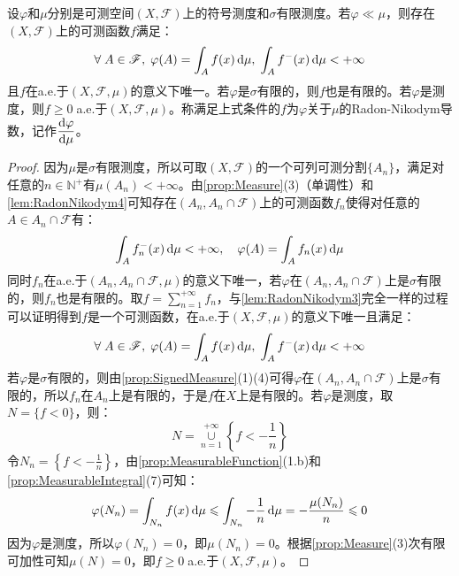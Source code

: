 \begin{theorem}\label{theo:RadonNikodym}
	设$\varphi$和$\mu$分别是可测空间$(X,\mathscr{F})$上的符号测度和$\sigma$有限测度。若$\varphi\ll\mu$，则存在$(X,\mathscr{F})$上的可测函数$f$满足：
	\begin{equation*}
		\forall\;A\in\mathscr{F},\;\varphi(A)=\int_{A}f(x)\mathop{}\!\mathrm{d}\mu,\;\int_{A }f^-(x)\mathop{}\!\mathrm{d}\mu<+\infty
	\end{equation*}
	且$f$在a.e.于$(X,\mathscr{F},\mu)$的意义下唯一。若$\varphi$是$\sigma$有限的，则$f$也是有限的。若$\varphi$是测度，则$f\geqslant0\;$a.e.于$(X,\mathscr{F},\mu)$。称满足上式条件的$f$为$\varphi$关于$\mu$的Radon-Nikodym导数，记作$\dfrac{\mathop{}\!\mathrm{d}\varphi}{\mathop{}\!\mathrm{d}\mu}$。
\end{theorem}
\begin{proof}
	因为$\mu$是$\sigma$有限测度，所以可取$(X,\mathscr{F})$的一个可列可测分割$\{A_n\}$，满足对任意的$n\in\mathbb{N}^+$有$\mu(A_n)<+\infty$。由\cref{prop:Measure}(3)（单调性）和\cref{lem:RadonNikodym4}可知存在$(A_n,A_n\cap\mathscr{F})$上的可测函数$f_n$使得对任意的$A\in A_n\cap\mathscr{F}$有：
	\begin{equation*}
		\int_{A}f_n^-(x)\mathop{}\!\mathrm{d}\mu<+\infty,\quad\varphi(A)=\int_{A}f_n(x)\mathop{}\!\mathrm{d}\mu
	\end{equation*}
	同时$f_n$在a.e.于$(A_n,A_n\cap\mathscr{F},\mu)$的意义下唯一，若$\varphi$在$(A_n,A_n\cap\mathscr{F})$上是$\sigma$有限的，则$f_n$也是有限的。取$f=\sum\limits_{n=1}^{+\infty}f_n$，与\cref{lem:RadonNikodym3}完全一样的过程可以证明得到$f$是一个可测函数，在a.e.于$(X,\mathscr{F},\mu)$的意义下唯一且满足：
	\begin{equation*}
		\forall\;A\in\mathscr{F},\;\varphi(A)=\int_{A}f(x)\mathop{}\!\mathrm{d}\mu,\;\int_{A}f^-(x)\mathop{}\!\mathrm{d}\mu<+\infty
	\end{equation*}
	若$\varphi$是$\sigma$有限的，则由\cref{prop:SignedMeasure}(1)(4)可得$\varphi$在$(A_n,A_n\cap\mathscr{F})$上是$\sigma$有限的，所以$f_n$在$A_n$上是有限的，于是$f$在$X$上是有限的。若$\varphi$是测度，取$N=\{f<0\}$，则：
	\begin{equation*}
		N=\underset{n=1}{\overset{+\infty}{\cup}}\left\{f<-\frac{1}{n}\right\}
	\end{equation*}
	令$N_n=\left\{f<-\frac{1}{n}\right\}$，由\cref{prop:MeasurableFunction}(1.b)和\cref{prop:MeasurableIntegral}(7)可知：
	\begin{equation*}
		\varphi(N_n)=\int_{N_n}f(x)\mathop{}\!\mathrm{d}\mu\leqslant\int_{N_n}-\frac{1}{n}\mathop{}\!\mathrm{d}\mu=-\frac{\mu(N_n)}{n}\leqslant0
	\end{equation*}
	因为$\varphi$是测度，所以$\varphi(N_n)=0$，即$\mu(N_n)=0$。根据\cref{prop:Measure}(3)次有限可加性可知$\mu(N)=0$，即$f\geqslant0\;$a.e.于$(X,\mathscr{F},\mu)$。
\end{proof}
